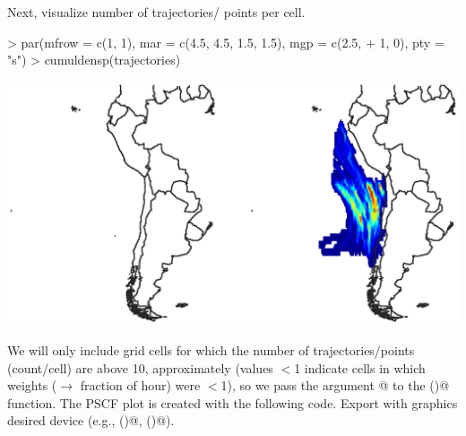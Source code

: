 \documentclass{article}
\renewenvironment{Schunk}{\vspace{\topsep}}{\vspace{\topsep}}
\begin{document}
Next, visualize number of trajectories/ points per cell.

\begin{Schunk}
\begin{Sinput}
> par(mfrow = c(1, 1), mar = c(4.5, 4.5, 1.5, 1.5), mgp = c(2.5, 
+     1, 0), pty = "s")
> cumuldensp(trajectories)
\end{Sinput}
\end{Schunk}
\includegraphics{figures/fig-016}

We will only include grid cells for which the number of
trajectories/points (count/cell) are above 10, approximately (values
$<$1 indicate cells in which weights ($\to$ fraction of hour) were
$<$1), so we pass the argument @ to the
\verb@showmap()@ function. The PSCF plot is created with the following
code. Export with graphics desired device (e.g., \verb@pdf()@,
\verb@png()@).
\end{document}
